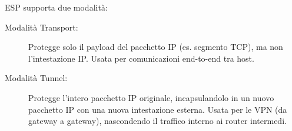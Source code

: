 ESP supporta due modalità:
\begin{description}
    \item[Modalità Transport:] Protegge solo il payload del pacchetto IP (es. segmento TCP), ma non l'intestazione IP. Usata per comunicazioni end-to-end tra host.
    \item[Modalità Tunnel:] Protegge l'intero pacchetto IP originale, incapsulandolo in un nuovo pacchetto IP con una nuova intestazione esterna. Usata per le VPN (da gateway a gateway), nascondendo il traffico interno ai router intermedi.
\end{description}